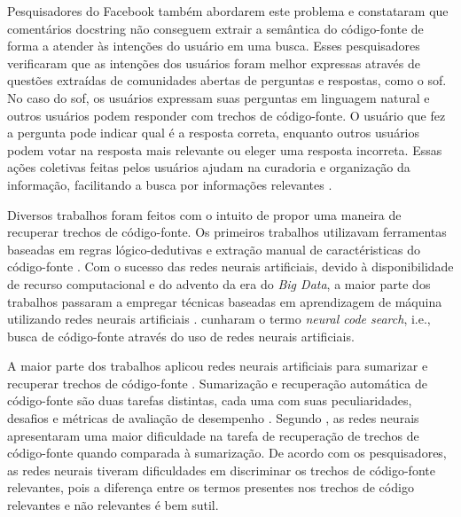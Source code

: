 Pesquisadores do Facebook \cite{cambronero-deep-learning-code-search:2019} também abordarem este problema e constataram que comentários \gls{docstring} não conseguem extrair a semântica do código-fonte de forma a atender às intenções do usuário em uma busca. Esses pesquisadores verificaram que as intenções dos usuários foram melhor expressas através de questões extraídas de comunidades abertas de perguntas e respostas, como o \gls{sof}. No caso do \Gls{sof}, os usuários expressam suas perguntas em linguagem natural e outros usuários podem responder com trechos de código-fonte. O usuário que fez a pergunta pode indicar qual é a resposta correta, enquanto outros usuários podem votar na resposta mais relevante ou eleger uma resposta incorreta. Essas ações coletivas feitas pelos usuários ajudam na curadoria e organização da informação, facilitando a busca por informações relevantes \cite{Wang-quora:2013, cambronero-deep-learning-code-search:2019}. 


Diversos trabalhos foram feitos com o intuito de propor uma maneira de recuperar trechos de código-fonte. Os primeiros trabalhos utilizavam ferramentas baseadas em regras lógico-dedutivas e extração manual de caractéristicas do código-fonte \cite{Allamanis:2018:SML}. Com o sucesso das redes neurais artificiais, devido à disponibilidade de recurso computacional e do advento da era do \textit{Big Data}, a maior parte dos trabalhos passaram a empregar técnicas baseadas em aprendizagem de máquina utilizando redes neurais artificiais \cite{Gu-deep-code-search:2018, yao-2018, iyer-etal-2016-summarizing, Allamanis-bimodal-source-code-natural-language:2015, Chen-bi-variational-autoencoder:2018, Sachdev-neural-code-search:2018, cambronero-deep-learning-code-search:2019}.  cunharam o termo \textit{neural code search}, i.e., busca de código-fonte através do uso de redes neurais artificiais.

A maior parte dos trabalhos aplicou redes neurais artificiais para sumarizar e recuperar trechos de código-fonte \cite{iyer-etal-2016-summarizing, Allamanis-bimodal-source-code-natural-language:2015, Chen-bi-variational-autoencoder:2018}. Sumarização e recuperação automática de código-fonte são duas tarefas distintas, cada uma com suas peculiaridades, desafios e métricas de avaliação de desempenho \cite{allahyari-text-summarization-2017}. Segundo , as redes neurais apresentaram uma maior dificuldade na tarefa de recuperação de trechos de código-fonte quando comparada à sumarização. De acordo com os pesquisadores, as redes neurais tiveram dificuldades em discriminar os trechos de código-fonte relevantes, pois a diferença entre os termos presentes nos trechos de código relevantes e não relevantes é bem sutil.

